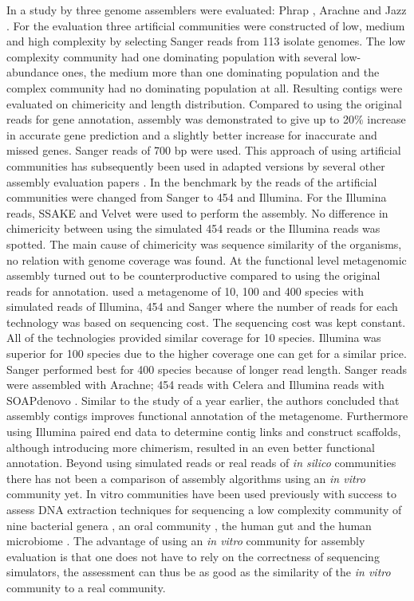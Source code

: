 \documentclass[a4paper,12pt]{report}
\begin{document}
In a study by \citet{Mavromatis17468765} three genome assemblers were
evaluated: Phrap \cite{delaBastide18428783}, Arachne \cite{Batzoglou11779843}
and Jazz \cite{Aparicio12142439}. For the evaluation three artificial
communities were constructed of low, medium and high complexity by selecting
Sanger reads from 113 isolate genomes. The low complexity community had one
dominating population with several low-abundance ones, the medium more than one
dominating population and the complex community had no dominating population at
all. Resulting contigs were evaluated on chimericity and length distribution.
Compared to using the original reads for gene annotation, assembly was
demonstrated to give up to 20\% increase in accurate gene prediction
and a slightly better increase for inaccurate and missed genes. Sanger reads of
700 bp were used. This approach of using artificial communities has
subsequently been used in adapted versions by several other assembly evaluation
papers \cite{Pignatelli21625384,Mende22384016}. In the benchmark by
\citet{Pignatelli21625384} the reads of the artificial communities were changed
from Sanger to 454 and Illumina. For the Illumina reads, SSAKE
\cite{Warren17158514} and Velvet were used to perform the assembly. No
difference in chimericity between using the simulated 454 reads or the Illumina
reads was spotted. The main cause of chimericity was sequence similarity of the
organisms, no relation with genome coverage was found. At the functional level
metagenomic assembly turned out to be counterproductive compared to using the
original reads for annotation. \citet{Mende22384016} used a metagenome of 10,
100 and 400 species with simulated reads of Illumina, 454 and Sanger where the
number of reads for each technology was based on sequencing cost. The
sequencing cost was kept constant. All of the technologies provided similar
coverage for 10 species. Illumina was superior for 100 species due to the
higher coverage one can get for a similar price.  Sanger performed best for 400
species because of longer read length. Sanger reads were assembled with
Arachne; 454 reads with Celera \cite{Myers10731133} and Illumina reads with
SOAPdenovo \cite{Li20019144}. Similar to the study of
\citet{Pignatelli21625384} a year earlier, the authors concluded that assembly
contigs improves functional annotation of the metagenome. Furthermore using
Illumina paired end data to determine contig links and construct scaffolds,
although introducing more chimerism, resulted in an even better functional
annotation.  Beyond using simulated reads or real reads of {\em in silico}
communities there has not been a comparison of assembly algorithms using an
{\em in vitro} community yet.  In vitro communities have been used previously
with success to assess DNA extraction techniques for sequencing a low
complexity community of nine bacterial genera \cite{Willner22514642}, an oral
community \cite{Diaz22520388}, the human gut \cite{Wu20673359} and the human
microbiome \cite{HMPC22699610}.  The advantage of using an {\em in vitro}
community for assembly evaluation is that one does not have to rely on the
correctness of sequencing simulators, the assessment can thus be as good as the
similarity of the {\em in vitro } community to a real community.
\end{document}
